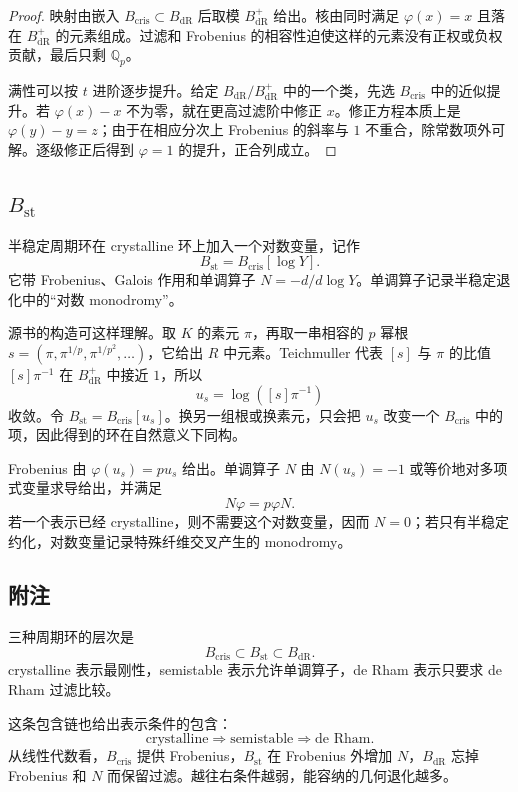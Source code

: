 \documentclass[11pt,a4paper,openany]{ctexbook}
\numberwithin{equation}{chapter}
\newcommand{\Q}{\mathbb{Q}}
\theoremstyle{plain}
\theoremstyle{definition}
\theoremstyle{remark}
\begin{document}
\begin{proof}
映射由嵌入 $B_{\mathrm{cris}}\subset B_{\mathrm{dR}}$ 后取模 $B_{\mathrm{dR}}^+$ 给出。核由同时满足 $\varphi(x)=x$ 且落在 $B_{\mathrm{dR}}^+$ 的元素组成。过滤和 Frobenius 的相容性迫使这样的元素没有正权或负权贡献，最后只剩 $\Q_p$。

满性可以按 $t$ 进阶逐步提升。给定 $B_{\mathrm{dR}}/B_{\mathrm{dR}}^+$ 中的一个类，先选 $B_{\mathrm{cris}}$ 中的近似提升。若 $\varphi(x)-x$ 不为零，就在更高过滤阶中修正 $x$。修正方程本质上是 $\varphi(y)-y=z$；由于在相应分次上 Frobenius 的斜率与 $1$ 不重合，除常数项外可解。逐级修正后得到 $\varphi=1$ 的提升，正合列成立。
\end{proof}

\subsection{\texorpdfstring{$B_{\mathrm{st}}$}{Bst}}

半稳定周期环在 crystalline 环上加入一个对数变量，记作
\[
  B_{\mathrm{st}}=B_{\mathrm{cris}}[\log Y].
\]
它带 Frobenius、Galois 作用和单调算子 $N=-d/d\log Y$。单调算子记录半稳定退化中的“对数 monodromy”。

源书的构造可这样理解。取 $K$ 的素元 $\pi$，再取一串相容的 $p$ 幂根 $s=(\pi,\pi^{1/p},\pi^{1/p^2},\ldots)$，它给出 $R$ 中元素。Teichmuller 代表 $[s]$ 与 $\pi$ 的比值 $[s]\pi^{-1}$ 在 $B_{\mathrm{dR}}^+$ 中接近 $1$，所以
\[
  u_s=\log([s]\pi^{-1})
\]
收敛。令 $B_{\mathrm{st}}=B_{\mathrm{cris}}[u_s]$。换另一组根或换素元，只会把 $u_s$ 改变一个 $B_{\mathrm{cris}}$ 中的项，因此得到的环在自然意义下同构。

Frobenius 由 $\varphi(u_s)=pu_s$ 给出。单调算子 $N$ 由 $N(u_s)=-1$ 或等价地对多项式变量求导给出，并满足
\[
  N\varphi=p\varphi N.
\]
若一个表示已经 crystalline，则不需要这个对数变量，因而 $N=0$；若只有半稳定约化，对数变量记录特殊纤维交叉产生的 monodromy。

\subsection{附注}

三种周期环的层次是
\[
  B_{\mathrm{cris}}\subset B_{\mathrm{st}}\subset B_{\mathrm{dR}}.
\]
crystalline 表示最刚性，semistable 表示允许单调算子，de Rham 表示只要求 de Rham 过滤比较。

这条包含链也给出表示条件的包含：
\[
  \text{crystalline}\Rightarrow\text{semistable}\Rightarrow\text{de Rham}.
\]
从线性代数看，$B_{\mathrm{cris}}$ 提供 Frobenius，$B_{\mathrm{st}}$ 在 Frobenius 外增加 $N$，$B_{\mathrm{dR}}$ 忘掉 Frobenius 和 $N$ 而保留过滤。越往右条件越弱，能容纳的几何退化越多。
\end{document}
